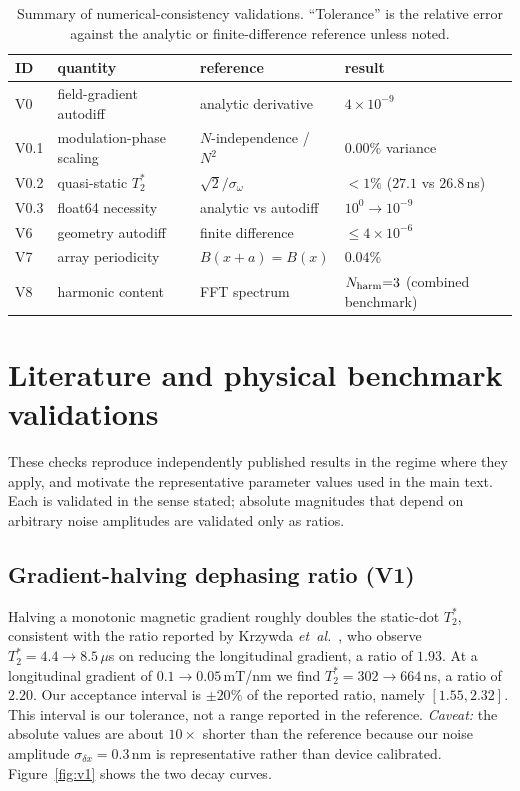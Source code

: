 \documentclass[aip,jap,reprint,onecolumn,superscriptaddress,longbibliography]{revtex4-2}
\begin{document}
\begin{table}[t]
\centering
\caption{Summary of numerical-consistency validations. ``Tolerance''
is the relative error against the analytic or finite-difference
reference unless noted.}
\label{tab:numerics}
\begin{tabular}{llll}
\toprule
ID & quantity & reference & result \\
\midrule
V0   & field-gradient autodiff      & analytic derivative        & $4\times10^{-9}$ \\
V0.1 & modulation-phase scaling     & $N$-independence / $N^2$   & $0.00\%$ variance \\
V0.2 & quasi-static $T_2^\ast$      & $\sqrt{2}/\sigma_\omega$   & $<1\%$ ($27.1$ vs $26.8$\,ns) \\
V0.3 & float64 necessity            & analytic vs autodiff       & $10^0\!\to\!10^{-9}$ \\
V6   & geometry autodiff            & finite difference          & $\le 4\times10^{-6}$ \\
V7   & array periodicity            & $B(x{+}a){=}B(x)$          & $0.04\%$ \\
V8   & harmonic content             & FFT spectrum               & $N_{\rm harm}{=}3$ (combined benchmark) \\
\bottomrule
\end{tabular}
\end{table}

\section{Literature and physical benchmark validations}
\label{sec:literature}

These checks reproduce independently published results in the regime
where they apply, and motivate the representative parameter values used
in the main text. Each is validated in the sense stated; absolute
magnitudes that depend on arbitrary noise amplitudes are validated only
as ratios.

\subsection{Gradient-halving dephasing ratio (V1)}
Halving a monotonic magnetic gradient roughly doubles the static-dot
$T_2^\ast$, consistent with the ratio reported by Krzywda
\emph{et~al.}~\cite{krzywda_coherence_2026}, who observe
$T_2^\ast=4.4\to8.5\,\mu$s on reducing the longitudinal gradient, a ratio
of $1.93$. At a longitudinal gradient of $0.1\to0.05$\,mT/nm we find
$T_2^\ast=302\to664$\,ns, a ratio of $2.20$. Our acceptance interval is $\pm20\%$ of the reported ratio, namely
$[1.55,2.32]$. This interval is our tolerance, not a range reported in the
reference. \emph{Caveat:} the absolute values are about $10\times$ shorter
than the reference because our noise amplitude $\sigma_{\delta x}=0.3$\,nm
is representative rather than device calibrated. Figure~\ref{fig:v1} shows the two
decay curves.
\end{document}
